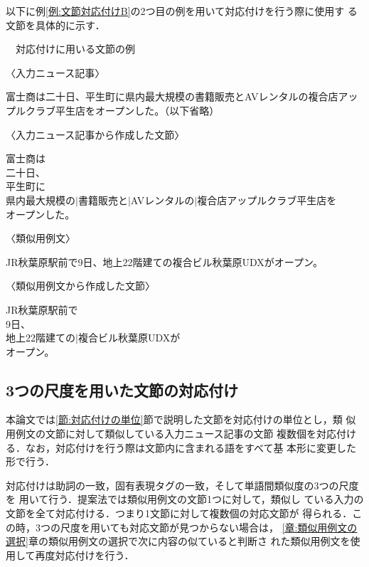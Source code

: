 \documentclass[japanese]{jnlp_1.4}
\newcounter{exp}
\def\exp#1{}
\begin{document}
以下に例\ref{例:文節対応付けB}の2つ目の例を用いて対応付けを行う際に使用す
る文節を具体的に示す．
\begin{screen}
\exp{例:文節対応付けB}　対応付けに用いる文節の例

〈入力ニュース記事〉

{\setlength{\leftskip}{2zw}
富士商は二十日、平生町に県内最大規模の書籍販売とAVレンタルの複合店アッ
プルクラブ平生店をオープンした。（以下省略）
\par}

〈入力ニュース記事から作成した文節〉

{\setlength{\leftskip}{2zw}
富士商は\\
二十日、\\
平生町に\\
県内最大規模の$|$書籍販売と$|$AVレンタルの$|$複合店アップルクラブ平生店を\\
オープンした。
\par}

〈類似用例文〉

{\setlength{\leftskip}{2zw}
JR秋葉原駅前で9日、地上22階建ての複合ビル秋葉原UDXがオープン。
\par}

〈類似用例文から作成した文節〉

{\setlength{\leftskip}{2zw}
JR秋葉原駅前で\\
9日、\\
地上22階建ての$|$複合ビル秋葉原UDXが\\
オープン。
\par}
\end{screen}


\subsection{3つの尺度を用いた文節の対応付け}\label{節:3つの尺度を用いた文節の対応付け}

本論文では\ref{節:対応付けの単位}節で説明した文節を対応付けの単位とし，類
似用例文の文節に対して類似している入力ニュース記事の文節
複数個を対応付ける．なお，対応付けを行う際は文節内に含まれる語をすべて基
本形に変更した形で行う．

対応付けは助詞の一致，固有表現タグの一致，そして単語間類似度の3つの尺度を
用いて行う．提案法では類似用例文の文節1つに対して，類似し
ている入力の文節を全て対応付ける．つまり1文節に対して複数個の対応文節が
得られる．この時，3つの尺度を用いても対応文節が見つからない場合は，
\ref{章:類似用例文の選択}章の類似用例文の選択で次に内容の似ていると判断さ
れた類似用例文を使用して再度対応付けを行う．
\end{document}
